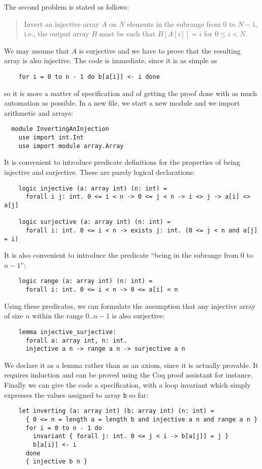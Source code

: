The second problem is stated as follows:
\begin{quote}
  Invert an injective array $A$ on $N$ elements in the
  subrange from $0$ to $N - 1$, i.e., the output array $B$ must be
  such that $B[A[i]] = i$ for $0 \le i < N$.
\end{quote}
We may assume that $A$ is surjective and we have to prove
that the resulting array is also injective.
The code is immediate, since it is as simple as
\begin{verbatim}
    for i = 0 to n - 1 do b[a[i]] <- i done
\end{verbatim}
so it is more a matter of specification and of getting the proof done
with as much automation as possible. In a new file, we start a new
module and we import arithmetic and arrays:
\begin{verbatim}
  module InvertingAnInjection
    use import int.Int
    use import module array.Array
\end{verbatim}
It is convenient to introduce predicate definitions for the properties
of being injective and surjective. These are purely logical
declarations:
\begin{verbatim}
    logic injective (a: array int) (n: int) =
      forall i j: int. 0 <= i < n -> 0 <= j < n -> i <> j -> a[i] <> a[j]

    logic surjective (a: array int) (n: int) =
      forall i: int. 0 <= i < n -> exists j: int. (0 <= j < n and a[j] = i)
\end{verbatim}
It is also convenient to introduce the predicate ``being in the
subrange from 0 to $n-1$'':
\begin{verbatim}
    logic range (a: array int) (n: int) =
      forall i: int. 0 <= i < n -> 0 <= a[i] < n
\end{verbatim}
Using these predicates, we can formulate the assumption that any
injective array of size $n$ within the range $0..n-1$ is also surjective:
\begin{verbatim}
    lemma injective_surjective:
      forall a: array int, n: int.
      injective a n -> range a n -> surjective a n
\end{verbatim}
We declare it as a lemma rather than as an axiom, since it is actually
provable. It requires induction and can be proved using the Coq proof
assistant for instance.
Finally we can give the code a specification, with a loop invariant
which simply expresses the values assigned to array \texttt{b} so far:
\begin{verbatim}
    let inverting (a: array int) (b: array int) (n: int) =
      { 0 <= n = length a = length b and injective a n and range a n }
      for i = 0 to n - 1 do
        invariant { forall j: int. 0 <= j < i -> b[a[j]] = j }
        b[a[i]] <- i
      done
      { injective b n }
\end{verbatim}
